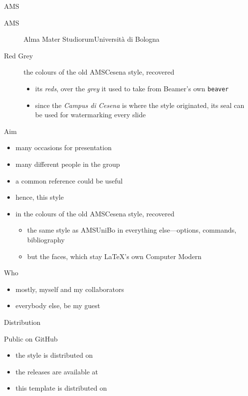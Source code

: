 \documentclass[presentation,cesena,apice]{beamer}\mode<presentation>{\usetheme{AMSRedGrey}}
\begin{document}
\begin{frame}[c]{AMS}
%
\begin{description}
	\item[AMS] Alma Mater Studiorum\textendash{}Università di Bologna
	\item[Red Grey] the colours of the old \alert{AMSCesena} style, recovered
	\begin{itemize}
		\item its \textcolor{rgred}{\textit{reds}}, over the \textcolor{rggreymid}{\textit{grey}} it used to take from Beamer's own \texttt{beaver}
		\item since the \emph{Campus di Cesena} is where the style originated, its seal can be used for watermarking every slide
	\end{itemize}
\end{description}
%
\end{frame}

\begin{frame}[c]{Aim}
%
\begin{itemize}
	\item many occasions for presentation
	\item many different people in the group
	\item a common reference could be useful
	\item hence, this style
	\item in the colours of the old \alert{AMSCesena} style, recovered
	\begin{itemize}
		\item the same style as \alert{AMSUniBo} in everything else---options, commands, bibliography
		\item but the faces, which stay \LaTeX{}'s own Computer Modern
	\end{itemize}
\end{itemize}
%
\end{frame}

\begin{frame}[c]{Who}
%
\begin{itemize}
	\item mostly, myself and my collaborators
	\item everybody else, be my guest
\end{itemize}
%
\end{frame}

\begin{frame}[c]{Distribution}
%
\begin{block}{Public on GitHub}
	\begin{itemize}
		\item the style is distributed on 
		\item the releases are available at 
		\item this template is distributed on 
	\end{itemize}
\end{block}
%
\end{frame}
\end{document}
